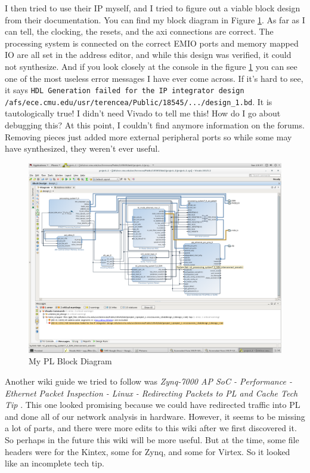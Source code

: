 \documentclass[12pt]{report}
\begin{document}
I then tried to use their IP myself, and I tried to figure out a viable block design from their documentation. You can find my block diagram in Figure \ref{fig:my_design}.
As far as I can tell, the clocking, the resets, and the axi connections are correct.
The processing system is connected on the correct EMIO ports and memory mapped IO are all set in the address editor, and while this design was verified, it could not synthesize.
And if you look closely at the console in the figure \ref{fig:my_design} you can see one of the most useless error messages I have ever come across.
If it's hard to see, it says \texttt{HDL Generation failed for the IP integrator design /afs/ece.cmu.edu/usr/terencea/Public/18545/.../design\_1.bd}.
It is tautologically true! I didn't need Vivado to tell me this! How do I go about debugging this?
At this point, I couldn't find anymore information on the forums.
Removing pieces just added more external peripheral ports so while some may have synthesized,
they weren't ever useful.

\begin{figure}[H]
\centering
\includegraphics[width=6in]{my_design}
\caption{My PL Block Diagram}
\label{fig:my_design}
\end{figure}

Another wiki guide we tried to follow was \textit{Zynq-7000 AP SoC - Performance - Ethernet Packet Inspection - Linux - Redirecting Packets to PL and Cache Tech Tip} \cite{redirect}. This one looked promising because we could have redirected traffic into PL and done all of our network analysis in hardware. However, it seems to be missing a lot of parts, and there were more edits to this wiki after we first discovered it. So perhaps in the future this wiki will be more useful. But at the time, some file headers were for the Kintex, some for Zynq, and some for Virtex. So it looked like an incomplete tech tip.
\end{document}
